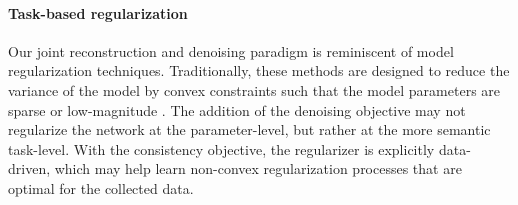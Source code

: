 \documentclass[10pt,twocolumn,letterpaper]{article}
\begin{document}

\paragraph{Task-based regularization} Our joint reconstruction and denoising paradigm is reminiscent of model regularization techniques. Traditionally, these methods are designed to reduce the variance of the model by convex constraints such that the model parameters are sparse or low-magnitude \cite{larsen1994generalization,van2017l2}. The addition of the denoising objective may not regularize the network at the parameter-level, but rather at the more semantic task-level. With the consistency objective, the regularizer is explicitly data-driven, which may help learn non-convex regularization processes that are optimal for the collected data.
\end{document}
